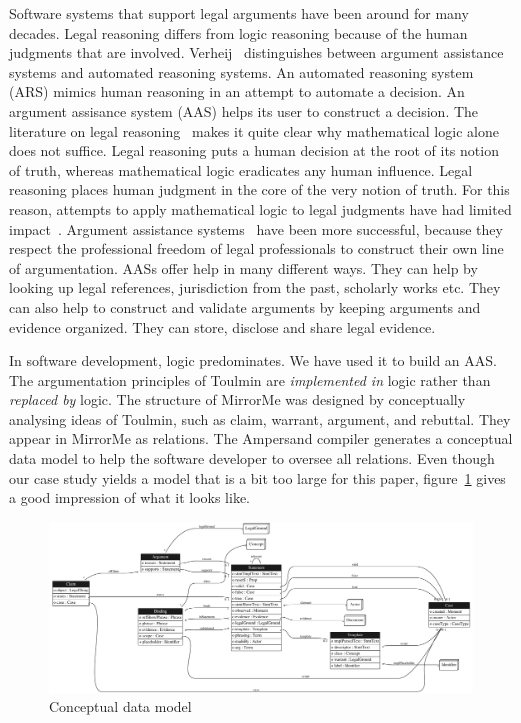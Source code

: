 \documentclass{elsarticle}
\begin{document}
	Software systems that support legal arguments have been around for many decades.
	Legal reasoning differs from logic reasoning because of the human judgments that are involved.
	Verheij~\cite{Verheij2003} distinguishes between argument assistance systems and automated reasoning systems.
	An automated reasoning system (ARS) mimics human reasoning in an attempt to automate a decision.
	An argument assisance system (AAS) helps its user to construct a decision.
	The literature on legal reasoning~\cite{Lind2007} makes it quite clear why mathematical logic alone does not suffice.
	Legal reasoning puts a human decision at the root of its notion of truth,
	whereas mathematical logic eradicates any human influence.
	Legal reasoning places human judgment in the core of the very notion of truth.
	For this reason, attempts to apply mathematical logic to legal judgments have had limited impact~\cite{Prakken2005}.
	Argument assistance systems~\cite{Verheij2005} have been more successful,
	because they respect the professional freedom of legal professionals to construct their own line of argumentation.
	AASs offer help in many different ways.
	They can help by looking up legal references, jurisdiction from the past, scholarly works etc.
	They can also help to construct and validate arguments by keeping arguments and evidence organized.
	They can store, disclose and share legal evidence.

	In software development, logic predominates.
	We have used it to build an AAS.
	The argumentation principles of Toulmin are \emph{implemented in} logic rather than \emph{replaced by} logic.
	The structure of MirrorMe was designed by conceptually analysing ideas of Toulmin,
	such as claim, warrant, argument, and rebuttal. They appear in MirrorMe as relations.
	The Ampersand compiler generates a conceptual data model
	to help the software developer to oversee all relations.
	Even though our case study yields a model that is a bit too large for this paper,
	figure~\ref{fig:conceptual model} gives a good impression of what it looks like.
\begin{figure}[htb]
\begin{center}
  \includegraphics[scale=.23]{LogicalDataModel.pdf}
\end{center}
\caption{Conceptual data model}
\label{fig:conceptual model}
\end{figure}
	
\end{document}
